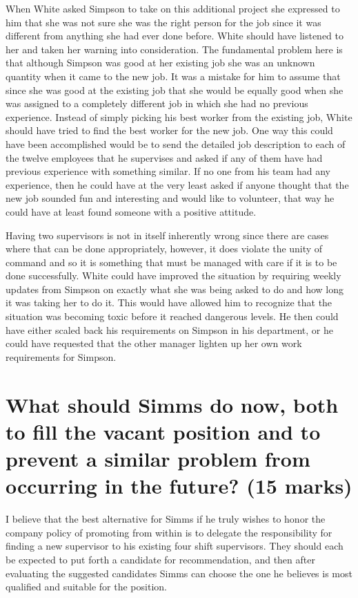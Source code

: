 \documentclass[letterpaper,12pt,titlepage]{article}
\begin{document}
When White asked Simpson to take on this additional project she expressed to him that she was not sure she was the right person for the job since it was different from anything she had ever done before. White should have listened to her and taken her warning into consideration. The fundamental problem here is that although Simpson was good at her existing job she was an unknown quantity when it came to the new job. It was a mistake for him to assume that since she was good at the existing job that she would be equally good when she was assigned to a completely different job in which she had no previous experience. Instead of simply picking his best worker from the existing job, White should have tried to find the best worker for the new job. One way this could have been accomplished would be to send the detailed job description to each of the twelve employees that he supervises and asked if any of them have had previous experience with something similar. If no one from his team had any experience, then he could have at the very least asked if anyone thought that the new job sounded fun and interesting and would like to volunteer, that way he could have at least found someone with a positive attitude. 

Having two supervisors is not in itself inherently wrong since there are cases where that can be done appropriately, however, it does violate the unity of command and so it is something that must be managed with care if it is to be done successfully. White could have improved the situation by requiring weekly updates from Simpson on exactly what she was being asked to do and how long it was taking her to do it. This would have allowed him to recognize that the situation was becoming toxic before it reached dangerous levels. He then could have either scaled back his requirements on Simpson in his department, or he could have requested that the other manager lighten up her own work requirements for Simpson. 

\section{What should Simms do now, both to fill the vacant position and to prevent a similar problem from occurring in the future? (15 marks)}

I believe that the best alternative for Simms if he truly wishes to honor the company policy of promoting from within is to delegate the responsibility for finding a new supervisor to his existing four shift supervisors. They should each be expected to put forth a candidate for recommendation, and then after evaluating the suggested candidates Simms can choose the one he believes is most qualified and suitable for the position. 
\end{document}
